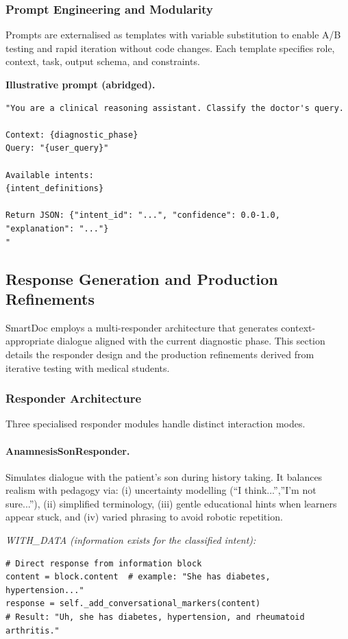 \subsubsection{Prompt Engineering and Modularity}

Prompts are externalised as templates with variable substitution to enable A/B
testing and rapid iteration without code changes. Each template specifies role,
context, task, output schema, and constraints.

\noindent\textbf{Illustrative prompt (abridged).}
\begin{verbatim}
"You are a clinical reasoning assistant. Classify the doctor's query.

Context: {diagnostic_phase}
Query: "{user_query}"

Available intents:
{intent_definitions}

Return JSON: {"intent_id": "...", "confidence": 0.0-1.0, "explanation": "..."}
"
\end{verbatim}

\subsection{Response Generation and Production Refinements}
\label{sec:response_generation}

SmartDoc employs a multi-responder architecture that generates context-appropriate
dialogue aligned with the current diagnostic phase. This section details the
responder design and the production refinements derived from iterative testing
with medical students.

\subsubsection{Responder Architecture}

Three specialised responder modules handle distinct interaction modes.

\paragraph{AnamnesisSonResponder.}
Simulates dialogue with the patient's son during history taking.
It balances realism with pedagogy via:
(i) uncertainty modelling (``I think...'',''I'm not sure...''), 
(ii) simplified terminology,
(iii) gentle educational hints when learners appear stuck, and
(iv) varied phrasing to avoid robotic repetition.

\noindent\textit{WITH\_DATA (information exists for the classified intent):}
\begin{verbatim}
# Direct response from information block
content = block.content  # example: "She has diabetes, hypertension..."
response = self._add_conversational_markers(content)
# Result: "Uh, she has diabetes, hypertension, and rheumatoid arthritis."
\end{verbatim}


